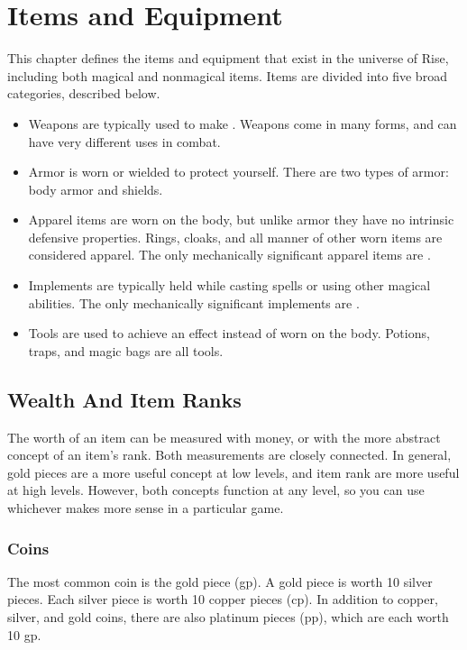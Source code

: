 \chapter{Items and Equipment}

This chapter defines the items and equipment that exist in the universe of Rise, including both magical and nonmagical items.
Items are divided into five broad categories, described below.
\begin{itemize}
    \item Weapons are typically used to make .
        Weapons come in many forms, and can have very different uses in combat.
    \item Armor is worn or wielded to protect yourself.
        There are two types of armor: body armor and shields.
    \item Apparel items are worn on the body, but unlike armor they have no intrinsic defensive properties.
        Rings, cloaks, and all manner of other worn items are considered apparel.
        The only mechanically significant apparel items are .
    \item Implements are typically held while casting spells or using other magical abilities.
        The only mechanically significant implements are .
    \item Tools are used to achieve an effect instead of worn on the body.
        Potions, traps, and magic bags are all tools.
\end{itemize}

\section{Wealth And Item Ranks}\label{Wealth}\label{Wealth and Item Ranks}

    The worth of an item can be measured with money, or with the more abstract concept of an item's rank.
    Both measurements are closely connected.
    In general, gold pieces are a more useful concept at low levels, and item rank are more useful at high levels.
    However, both concepts function at any level, so you can use whichever makes more sense in a particular game.

    \subsection{Coins}
        The most common coin is the gold piece (gp). A gold piece is worth 10 silver pieces. Each silver piece is worth 10 copper pieces (cp). In addition to copper, silver, and gold coins, there are also platinum pieces (pp), which are each worth 10 gp.

